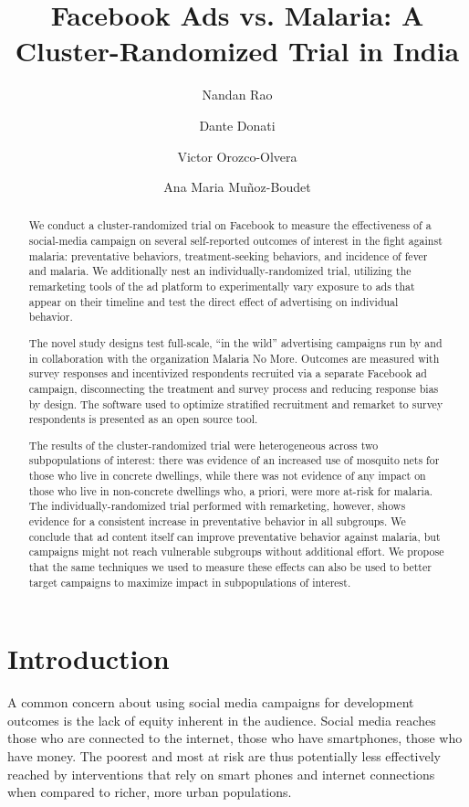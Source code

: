 \documentclass[a4paper,12pt]{article}
\author{
  Nandan Rao\\
  \and
  Dante Donati\\
  \and
  Victor Orozco-Olvera\\
  \and
  Ana Maria Muñoz-Boudet
}
\title{Facebook Ads vs. Malaria: A Cluster-Randomized Trial in India}
\begin{document}
\maketitle

\begin{abstract}
We conduct a cluster-randomized trial on Facebook to measure the effectiveness of a social-media campaign on several self-reported outcomes of interest in the fight against malaria: preventative behaviors, treatment-seeking behaviors, and incidence of fever and malaria. We additionally nest an individually-randomized trial, utilizing the remarketing tools of the ad platform to experimentally vary exposure to ads that appear on their timeline and test the direct effect of advertising on individual behavior.

The novel study designs test full-scale, ``in the wild'' advertising campaigns run by and in collaboration with the organization Malaria No More. Outcomes are measured with survey responses and incentivized respondents recruited via a separate Facebook ad campaign, disconnecting the treatment and survey process and reducing response bias by design. The software used to optimize stratified recruitment and remarket to survey respondents is presented as an open source tool.

The results of the cluster-randomized trial were heterogeneous across two subpopulations of interest: there was evidence of an increased use of mosquito nets for those who live in concrete dwellings, while there was not evidence of any impact on those who live in non-concrete dwellings who, a priori, were more at-risk for malaria. The individually-randomized trial performed with remarketing, however, shows evidence for a consistent increase in preventative behavior in all subgroups. We conclude that ad content itself can improve preventative behavior against malaria, but campaigns might not reach vulnerable subgroups without additional effort. We propose that the same techniques we used to measure these effects can also be used to better target campaigns to maximize impact in subpopulations of interest.


\end{abstract}

\clearpage

\section{Introduction}

A common concern about using social media campaigns for development outcomes is the lack of equity inherent in the audience. Social media reaches those who are connected to the internet, those who have smartphones, those who have money. The poorest and most at risk are thus potentially less effectively reached by interventions that rely on smart phones and internet connections when compared to richer, more urban populations.
\end{document}
